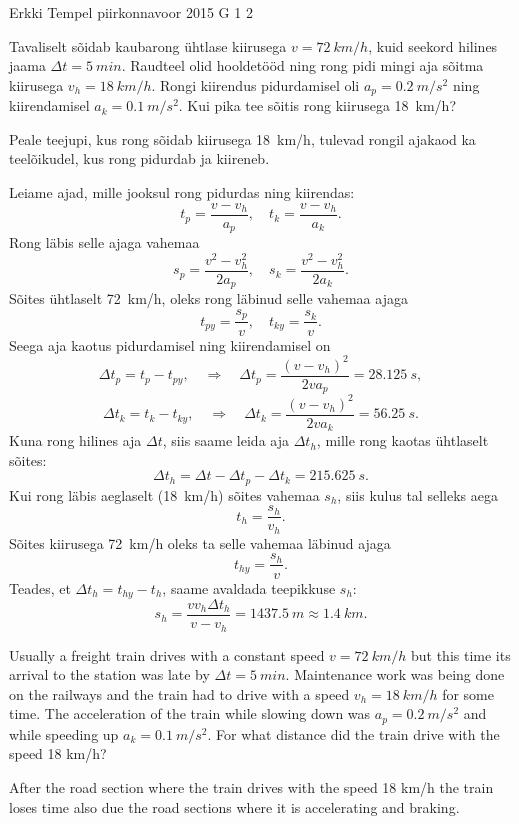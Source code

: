 {Erkki Tempel} %
{piirkonnavoor} %
{2015} %
{G 1} %
{2} %
{
\ifStatement
Tavaliselt sõidab kaubarong ühtlase kiirusega $v=\SI{72}{km/h}$, kuid seekord hilines jaama $\Delta t=\SI{5}{min}$. Raudteel olid hooldetööd ning rong pidi mingi aja sõitma kiirusega $v_{h}=\SI{18}{km/h}$. Rongi kiirendus pidurdamisel oli $a_p=\SI{0,2}{m/s^2}$ ning kiirendamisel $a_k=\SI{0,1}{m/s^2}$. Kui pika tee sõitis rong kiirusega \SI{18}{km/h}?
\fi


\ifHint
Peale teejupi, kus rong sõidab kiirusega \SI{18}{km/h}, tulevad rongil ajakaod ka teelõikudel, kus rong pidurdab ja kiireneb.
\fi


\ifSolution
Leiame ajad, mille jooksul rong pidurdas ning kiirendas:
\[ t_p = \frac{v - v_h}{a_p},\quad t_k = \frac{v-v_h}{a_k}. \]
Rong läbis selle ajaga vahemaa
\[ s_p = \frac{v^2-v_h^2}{2a_p}, \quad s_k = \frac{v^2-v_h^2}{2a_k}. \]
Sõites ühtlaselt \SI{72}{km/h}, oleks rong läbinud selle vahemaa ajaga
\[ t_{py} = \frac{s_p}{v},\quad t_{ky} =\frac{s_k}{v}. \]
Seega aja kaotus pidurdamisel ning kiirendamisel on 
\[ \Delta t_p = t_{p} - t_{py}, \quad\Rightarrow\quad \Delta t_p = \frac{(v-v_h)^2}{2va_p}=\SI{28,125}{s},\]
\[ \Delta t_k = t_{k} - t_{ky}, \quad\Rightarrow\quad \Delta t_k = \frac{(v-v_h)^2}{2va_k}=\SI{56,25}{s}.\]
Kuna rong hilines aja $\Delta t$, siis saame leida aja $\Delta t_h$, mille rong kaotas ühtlaselt sõites:
\[ \Delta t_h = \Delta t - \Delta t_p - \Delta t_k = \SI{215,625}{s}. \]
Kui rong läbis aeglaselt (\SI{18}{km/h}) sõites vahemaa $s_h$, siis kulus tal selleks aega
\[ t_h = \frac{s_h}{v_h}. \]
Sõites kiirusega \SI{72}{km/h} oleks ta selle vahemaa läbinud ajaga
\[ t_{hy} = \frac{s_h}{v}. \]
Teades, et $\Delta t_h = t_{hy} - t_h$, saame avaldada teepikkuse $s_h$:
\[ s_h = \frac{vv_h\Delta t_h}{v-v_h} = \SI{1437,5}{m} \approx \SI{1,4}{km}.\] 
\fi


\ifEngStatement
Usually a freight train drives with a constant speed $v=\SI{72}{km/h}$ but this time its arrival to the station was late by $\Delta t=\SI{5}{min}$. Maintenance work was being done on the railways and the train had to drive with a speed $v_{h}=\SI{18}{km/h}$ for some time. The acceleration of the train while slowing down was $a_p=\SI{0,2}{m/s^2}$ and while speeding up $a_k=\SI{0,1}{m/s^2}$. For what distance did the train drive with the speed 18 km/h?
\fi


\ifEngHint
After the road section where the train drives with the speed 18 km/h the train loses time also due the road sections where it is accelerating and braking.
\fi


}
